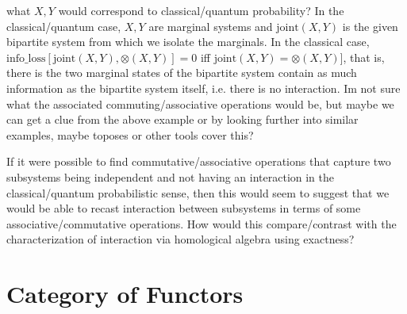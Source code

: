 \documentclass{book}
\begin{document}
	what $X,Y$ would correspond to classical/quantum probability? In the classical/quantum case, $X,Y$ are marginal systems and $\text{joint}(X,Y)$ is the given bipartite system from which we isolate the marginals. In the classical case, $\text{info\_loss}[\text{joint}(X,Y), \otimes(X,Y)] = 0$ iff $\text{joint}(X,Y) = \otimes(X,Y)]$, that is, there is the two marginal states of the bipartite system contain as much information as the bipartite system itself, i.e. there is no interaction. Im not sure what the associated commuting/associative operations would be, but maybe we can get a clue from the above example or by looking further into similar examples, maybe toposes or other tools cover this? 
	
	If it were possible to find commutative/associative operations that capture two subsystems being independent and not having an interaction in the classical/quantum probabilistic sense, then this would seem to suggest that we would be able to recast interaction between subsystems in terms of some associative/commutative operations. How would this compare/contrast with the characterization of interaction via homological algebra using exactness? 
	
	
	
	
	
	
	
	
	
	
	
	
	
	
	
	
	





	
	
	
	
	
	
	
	
	
	
	
	
	
	
	
	
	
	
	
	
	
	
	
	
	
	
	
	
	
	
	
	
	
	
	
	
	
	
	
	\section{Category of Functors}
\end{document}
